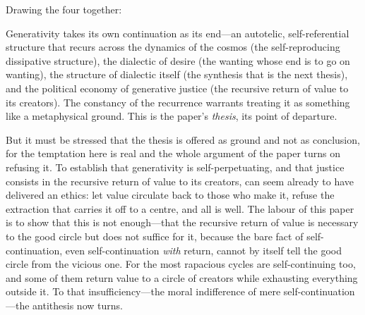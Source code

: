 Drawing the four together:

\begin{claim}
Generativity takes its own continuation as its end---an autotelic, self-referential structure that recurs across the dynamics of the cosmos (the self-reproducing dissipative structure), the dialectic of desire (the wanting whose end is to go on wanting), the structure of dialectic itself (the synthesis that is the next thesis), and the political economy of generative justice (the recursive return of value to its creators). The constancy of the recurrence warrants treating it as something like a metaphysical ground. This is the paper's \emph{thesis}, its point of departure.
\end{claim}

But it must be stressed that the thesis is offered as ground and not as conclusion, for the temptation here is real and the whole argument of the paper turns on refusing it. To establish that generativity is self-perpetuating, and that justice consists in the recursive return of value to its creators, can seem already to have delivered an ethics: let value circulate back to those who make it, refuse the extraction that carries it off to a centre, and all is well. The labour of this paper is to show that this is not enough---that the recursive return of value is necessary to the good circle but does not suffice for it, because the bare fact of self-continuation, even self-continuation \emph{with} return, cannot by itself tell the good circle from the vicious one. For the most rapacious cycles are self-continuing too, and some of them return value to a circle of creators while exhausting everything outside it. To that insufficiency---the moral indifference of mere self-continuation---the antithesis now turns.
